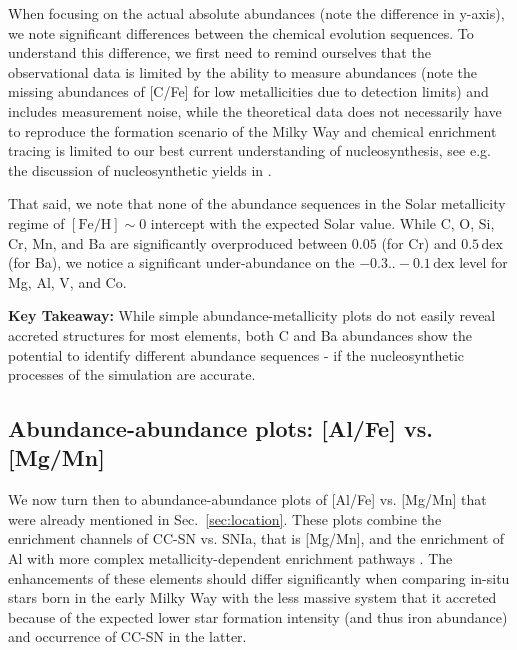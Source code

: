 \documentclass[fleqn,usenatbib]{mnras}
\begin{document}
When focusing on the actual absolute abundances (note the difference in y-axis), we note significant differences between the chemical evolution sequences. To understand this difference, we first need to remind ourselves that the observational data is limited by the ability to measure abundances (note the missing abundances of [C/Fe] for low metallicities due to detection limits) and includes measurement noise, while the theoretical data does not necessarily have to reproduce the formation scenario of the Milky Way and chemical enrichment tracing is limited to our best current understanding of nucleosynthesis, see e.g. the discussion of nucleosynthetic yields in \citet{Buck2021}.

That said, we note that none of the abundance sequences in the Solar metallicity regime of $\mathrm{[Fe/H]} \sim 0$ intercept with the expected Solar value. While C, O, Si, Cr, Mn, and Ba are significantly overproduced between $0.05$ (for Cr) and $0.5\,\mathrm{dex}$ (for Ba), we notice a significant under-abundance on the $-0.3..-0.1\,\mathrm{dex}$ level for Mg, Al, V, and Co.

\textbf{Key Takeaway:} While simple abundance-metallicity plots do not easily reveal accreted structures for most elements, both C and Ba abundances show the potential to identify different abundance sequences - if the nucleosynthetic processes of the simulation are accurate.

\subsection{Abundance-abundance plots: [Al/Fe] vs. [Mg/Mn]} \label{sec:alfe_mgmn}

We now turn then to abundance-abundance plots of [Al/Fe] vs. [Mg/Mn] that were already mentioned in Sec.~\ref{sec:location}. These plots combine the enrichment channels of CC-SN vs. SNIa, that is [Mg/Mn], and the enrichment of Al with more complex metallicity-dependent enrichment pathways \citep{Hawkins2015, Das2020, Kobayashi2020}. The enhancements of these elements should differ significantly when comparing in-situ stars born in the early Milky Way with the less massive system that it accreted because of the expected lower star formation intensity (and thus iron abundance) and occurrence of CC-SN in the latter. 
\end{document}
